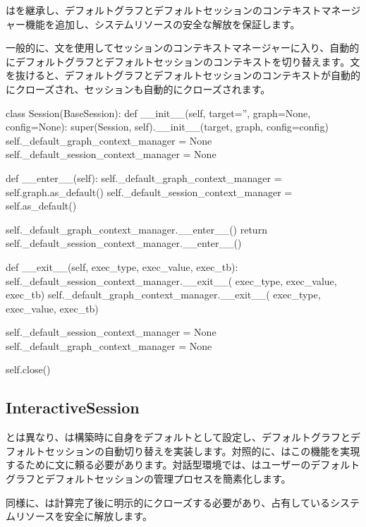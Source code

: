 \begin{content}
\begin{content}
はを継承し、デフォルトグラフとデフォルトセッションのコンテキストマネージャー機能を追加し、システムリソースの安全な解放を保証します。

一般的に、文を使用してセッションのコンテキストマネージャーに入り、自動的にデフォルトグラフとデフォルトセッションのコンテキストを切り替えます。文を抜けると、デフォルトグラフとデフォルトセッションのコンテキストが自動的にクローズされ、セッションも自動的にクローズされます。

\begin{leftbar}
\begin{python}
class Session(BaseSession):
  def __init__(self, target='', graph=None, config=None):
    super(Session, self).__init__(target, graph, config=config)
    self._default_graph_context_manager = None
    self._default_session_context_manager = None

  def __enter__(self):
    self._default_graph_context_manager = self.graph.as_default()
    self._default_session_context_manager = self.as_default()

    self._default_graph_context_manager.__enter__()
    return self._default_session_context_manager.__enter__()

  def __exit__(self, exec_type, exec_value, exec_tb):
    self._default_session_context_manager.__exit__(
        exec_type, exec_value, exec_tb)
    self._default_graph_context_manager.__exit__(
        exec_type, exec_value, exec_tb)

    self._default_session_context_manager = None
    self._default_graph_context_manager = None

    self.close()
\end{python}
\end{leftbar}

\subsection{InteractiveSession}

とは異なり、は構築時に自身をデフォルトとして設定し、デフォルトグラフとデフォルトセッションの自動切り替えを実装します。対照的に、はこの機能を実現するために文に頼る必要があります。対話型環境では、はユーザーのデフォルトグラフとデフォルトセッションの管理プロセスを簡素化します。

同様に、は計算完了後に明示的にクローズする必要があり、占有しているシステムリソースを安全に解放します。


\end{content}
\end{content}
